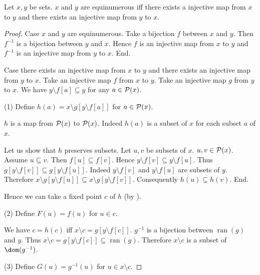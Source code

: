 \documentclass{article}
\newcommand{\pow}{{\cal P}}
\newcommand{\range}{\operatorname{ran}}
\newcommand{\inv}[1]{#1^{-1}}
\begin{document}
 \begin{forthel}

   \begin{theorem*}[title=Cantor-Schröder-Bernstein,id=CSB]
      Let $x,y$ be sets.
      $x$ and $y$ are equinumerous iff there exists a injective map from $x$ to
      $y$ and there exists an injective map from $y$ to $x$.
    \end{theorem*}
    \begin{proof}
      Case $x$ and $y$ are equinumerous.
        Take a bijection $f$ between $x$ and $y$.
        Then $\inv{f}$ is a bijection between $y$ and $x$.
        Hence $f$ is an injective map from $x$ to $y$ and $\inv{f}$ is an
        injective map from $y$ to $x$.
      End.

      Case there exists an injective map from $x$ to $y$ and there exists an
      injective map from $y$ to $x$.
        Take an injective map $f$ from $x$ to $y$.
        Take an injective map $g$ from $y$ to $x$.
        We have $y \setminus f[a] \subseteq y$ for any $a \in \pow(x)$.

        (1) Define $h(a) = x \setminus g[y \setminus f[a]]$ for $a \in \pow(x)$.

        $h$ is a map from $\pow(x)$ to $\pow(x)$.
        Indeed $h(a)$ is a subset of $x$ for each subset $a$ of $x$.

        Let us show that $h$ preserves subsets.
          Let $u, v$ be subsets of $x$. $u,v \in \pow(x)$.
          Assume $u \subseteq v$.
          Then $f[u] \subseteq f[v]$.
          Hence $y \setminus f[v] \subseteq y \setminus f[u]$.
          Thus $g[y \setminus f[v]] \subseteq g[y \setminus f[u]]$.
          Indeed $y \setminus f[v]$ and $y \setminus f[u]$ are subsets of $y$.
          Therefore $x \setminus g[y \setminus f[u]] \subseteq
          x \setminus g[y \setminus f[v]]$.
          Consequently $h(u) \subseteq h(v)$.
        End.

        Hence we can take a fixed point $c$ of $h$ (by ).

        (2) Define $F(u) = f(u)$ for $u \in c$.

        We have $c = h(c)$ iff $x \setminus c = g[y \setminus f[c]]$.
        $\inv{g}$ is a bijection between $\range(g)$ and $y$.
        Thus $x \setminus c = g[y \setminus f[c]] \subseteq \range(g)$.
        Therefore $x \setminus c$ is a subset of $\dom(\inv{g})$.

        (3) Define $G(u) = \inv{g}(u)$ for $u \in x \setminus c$.


\end{proof}
\end{forthel}
\end{document}
